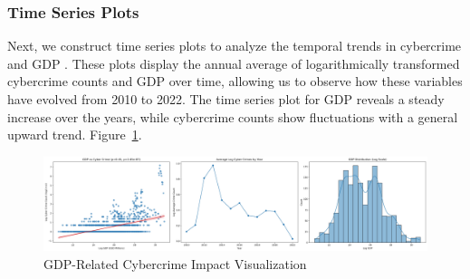     \subsubsection{Time Series Plots} %
        Next, we construct time series plots to analyze the temporal trends in cybercrime and GDP .
        These plots display the annual average of logarithmically transformed cybercrime counts and GDP over time,
        allowing us to observe how these variables have evolved from 2010 to 2022.
        The time series plot for GDP reveals a steady increase over the years,
        while cybercrime counts show fluctuations with a general upward trend.
        Figure~\ref{fig:gdp}.
        \begin{figure}[htb]
            \centering
            \includegraphics[width=1\linewidth]{../rsrc/demographics/gdp_crime_and_time}
            \caption{GDP-Related Cybercrime Impact Visualization}\label{fig:gdp}
        \end{figure}

